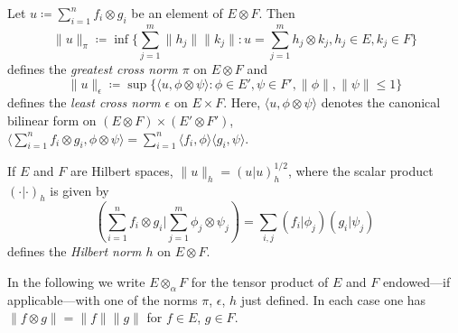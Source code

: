 Let $u \coloneqq \sum_{i=1}^{n} f_{i} \otimes g_{i}$ be an element of\/ $E \otimes F$. 
Then
%
\[
\|u\|_{\pi} \coloneqq \inf\{\sum_{j=1}^{m} \|h_{j}\| \|k_{j}\| \colon u = \sum_{j=1}^{m}h_{j} \otimes k_{j}, h_{j} \in E, k_{j} \in F\}
\]
defines the \emph{greatest cross norm $\pi$} on $E \otimes F$ and
%
\[
\|u\|_{\epsilon} \coloneqq \sup\{\langle u,\phi \otimes \psi\rangle \colon \phi \in E', \psi \in F', \|\phi\|, \|\psi\| \leq 1\}
\]
defines the \emph{least cross norm $\epsilon$} on $E \times F$. 
Here, $\langle u,\phi \otimes \psi\rangle$ denotes the canonical bilinear form on $(E \otimes F) \times (E' \otimes F')$, \ie $\langle\sum_{i=1}^{n} f_{i} \otimes g_{i},\phi \otimes \psi\rangle = \sum_{i=1}^{n} \langle f_{i},\phi\rangle\langle g_{i},\psi\rangle$.

If\/ $E$ and $F$ are Hilbert spaces, $\|u\|_{h} = (u|u)_{h}^{1/2}$, where the scalar product $(\cdot|\cdot)_{h}$ is given by 
\[\textstyle
\left(\sum_{i=1}^{n} f_{i} \otimes g_{i}\big\vert\sum_{j=1}^{m}\phi_{j} \otimes \psi_{j}\right) = \sum_{i,j} (f_{i}\vert\phi_{j})(g_{i}\vert\psi_{j})
\]
defines the \emph{Hilbert norm $h$} on $E \otimes F$.

In the following we write $E \otimes_{\alpha} F$ for the tensor product of\/ $E$ and $F$ endowed---if applicable---with one of the norms $\pi$, $\epsilon$, $h$ just defined.
In each case one has $\|f \otimes g\| = \|f\| \|g\|$ for $f \in E$, $g \in F$.

